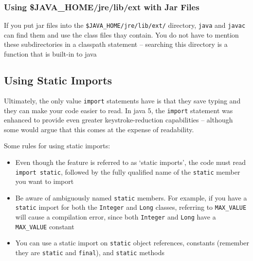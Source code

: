 \subsubsection{Using \$JAVA\_HOME/jre/lib/ext with Jar Files}
If you put jar files into the \verb#$JAVA_HOME/jre/lib/ext/# directory, 
\verb#java# and \verb#javac# can find them and use the class files thay 
contain. You do not have to mention these subdirectories in a classpath 
statement -- searching this directory is a function that is built-in to java

\subsection{Using Static Imports}
Ultimately, the only value \verb#import# statements have is that they save 
typing and they can make your code easier to read. In java 5, the \verb#import# 
statement was enhanced to provide even greater keystroke-reduction capabilities 
-- although some would argue that this comes at the expense of readability.

Some rules for using static imports:
\begin{itemize}
    \item Even though the feature is referred to as `static imports', the code 
    must read \verb#import static#, followed by the fully qualified name of the 
    \verb#static# member you want to import
    \item Be aware of ambiguously named \verb#static# members. For example, if 
    you have a \verb#static# import for both the \verb#Integer# and \verb#Long# 
    classes, referring to \verb#MAX_VALUE# will cause a compilation error, 
    since both \verb#Integer# and \verb#Long# have a \verb#MAX_VALUE# constant
    \item You can use a static import on \verb#static# object references, 
    constants (remember they are \verb#static# and \verb#final#), and 
    \verb#static# methods
\end{itemize}
